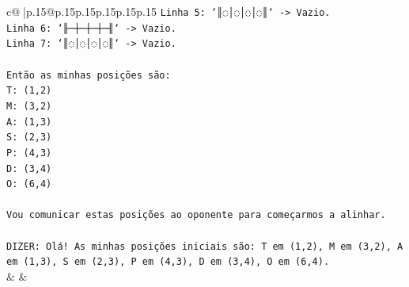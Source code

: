 \documentclass{article}
\begin{document}
{\begin{supertabular}{c@{$\;$}|p{.15\linewidth}@{}p{.15\linewidth}p{.15\linewidth}p{.15\linewidth}p{.15\linewidth}p{.15\linewidth}}
{{{\texttt{Linha 5: `║◌│◌│◌│◌║` {-}> Vazio.} \\
\texttt{Linha 6: `╟─┼─┼─┼─╢` {-}> Vazio.} \\
\texttt{Linha 7: `║◌│◌│◌│◌║` {-}> Vazio.} \\
\\ 
\texttt{Então as minhas posições são:} \\
\texttt{T: (1,2)} \\
\texttt{M: (3,2)} \\
\texttt{A: (1,3)} \\
\texttt{S: (2,3)} \\
\texttt{P: (4,3)} \\
\texttt{D: (3,4)} \\
\texttt{O: (6,4)} \\
\\ 
\texttt{Vou comunicar estas posições ao oponente para começarmos a alinhar.} \\
\\ 
\texttt{DIZER: Olá! As minhas posições iniciais são: T em (1,2), M em (3,2), A em (1,3), S em (2,3), P em (4,3), D em (3,4), O em (6,4).} \\
            }
        }
    }
    & & \\ \\


\end{supertabular}}
\end{document}
